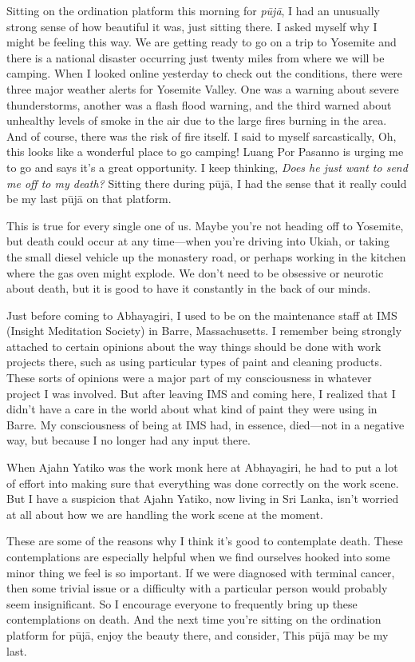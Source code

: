 Sitting on the ordination platform this morning for \emph{pūjā}, I 
had an unusually strong sense of how beautiful it was, just sitting 
there. I asked myself why I might be feeling this way. We are getting 
ready to go on a trip to Yosemite and there is a national disaster 
occurring just twenty miles from where we will be camping. When I 
looked online yesterday to check out the conditions, there were three 
major weather alerts for Yosemite Valley. One was a warning about 
severe thunderstorms, another was a flash flood warning, and the third 
warned about unhealthy levels of smoke in the air due to the large 
fires burning in the area. And of course, there was the risk of fire 
itself. I said to myself sarcastically, Oh, this looks like a wonderful 
place to go camping! Luang Por Pasanno is urging me to go and says it's 
a great opportunity. I keep thinking, \emph{Does he just want to send 
me off to my death?} Sitting there during pūjā, I had the sense that 
it really could be my last pūjā on that platform.

This is true for every single one of us. Maybe you're not heading off 
to Yosemite, but death could occur at any time---when you're driving 
into Ukiah, or taking the small diesel vehicle up the monastery road, 
or perhaps working in the kitchen where the gas oven might explode. We 
don't need to be obsessive or neurotic about death, but it is good to 
have it constantly in the back of our minds.

Just before coming to Abhayagiri, I used to be on the maintenance staff 
at IMS (Insight Meditation Society) in Barre, Massachusetts. I remember 
being strongly attached to certain opinions about the way things should 
be done with work projects there, such as using particular types of 
paint and cleaning products. These sorts of opinions were a major part 
of my consciousness in whatever project I was involved. But after 
leaving IMS and coming here, I realized that I didn't have a care in 
the world about what kind of paint they were using in Barre. My 
consciousness of being at IMS had, in essence, died---not in a negative 
way, but because I no longer had any input there.

When Ajahn Yatiko was the work monk here at Abhayagiri, he had to put a 
lot of effort into making sure that everything was done correctly on 
the work scene. But I have a suspicion that Ajahn Yatiko, now living in 
Sri Lanka, isn't worried at all about how we are handling the work 
scene at the moment.

These are some of the reasons why I think it's good to contemplate 
death. These contemplations are especially helpful when we find 
ourselves hooked into some minor thing we feel is so important. If we 
were diagnosed with terminal cancer, then some trivial issue or a 
difficulty with a particular person would probably seem insignificant. 
So I encourage everyone to frequently bring up these contemplations on 
death. And the next time you're sitting on the ordination platform for 
pūjā, enjoy the beauty there, and consider, This pūjā may be my 
last.

